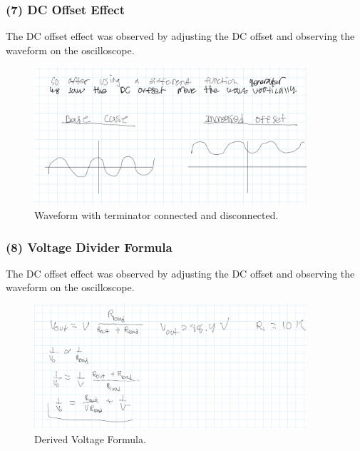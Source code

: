 \documentclass{article}
\begin{document}
    \subsubsection{(7) DC Offset Effect}
    The DC offset effect was observed by adjusting the DC offset and observing the waveform on the oscilloscope. 
    
    \begin{figure}[H]
        \centering
        \includegraphics[width=0.9\textwidth]{img/Lab1_7.png}  
        \caption{Waveform with terminator connected and disconnected.}
        \label{fig:terminated_waveform}
    \end{figure}

    \subsubsection{(8) Voltage Divider Formula}
    The DC offset effect was observed by adjusting the DC offset and observing the waveform on the oscilloscope. 
    
    \begin{figure}[H]
        \centering
        \includegraphics[width=0.9\textwidth]{img/Lab1_8.png}  
        \caption{Derived Voltage Formula.}
        \label{fig:Derived Voltage Formula}
    \end{figure}
\end{document}
